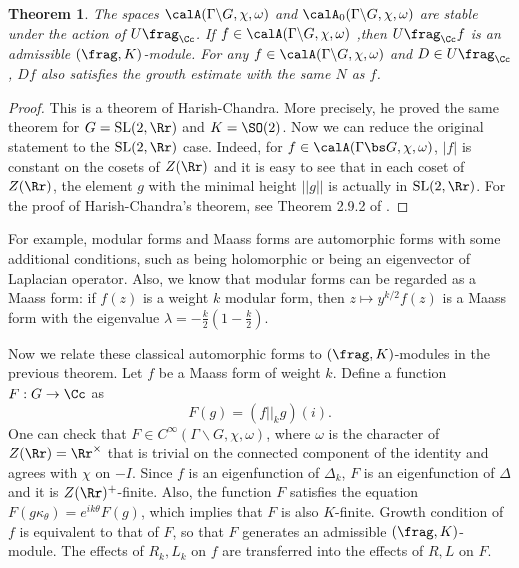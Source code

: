 \documentclass{article}
\newtheorem{theorem}{Theorem}[section]
\newcommand{\SL}{\mathrm{SL}}
\begin{document}
\begin{theorem}
\label{autoadm}
The spaces $\calA(\Gamma\backslash G, \chi, \omega)$ and $\calA_{0}(\Gamma \backslash G, \chi, \omega)$ are stable under the action of $U\frag_{\Cc}$. If $f\in \calA(\Gamma\backslash G, \chi, \omega)$ ,then $U\frag_{\Cc}f$ is an admissible $(\frag, K)$-module. 
For any $f\in  \calA(\Gamma\backslash G, \chi, \omega)$ and $D\in U\frag_{\Cc}$, $Df$ also satisfies the growth estimate with the same $N$ as $f$. 
\end{theorem}

\begin{proof}
This is a theorem of Harish-Chandra. More precisely, he proved the same theorem for $G = \SL(2, \Rr)$ and $K = \SO(2)$. Now we can reduce the original statement to the $\SL(2, \Rr)$ case. 
Indeed, for $f\in \calA(\Gamma \bs G, \chi, \omega)$, $|f|$ is constant on the cosets of $Z(\Rr)$ and it is easy to see that in each coset of $Z(\Rr)$, the element $g$ with the minimal height $||g||$ is actually in $\SL(2, \Rr)$. 
For the proof of Harish-Chandra's theorem, see Theorem 2.9.2 of \cite{bu}.
\end{proof}

For example, modular forms and Maass forms are automorphic forms with some additional conditions, such as being holomorphic  or being an eigenvector of Laplacian operator. 
Also, we know that modular forms can be regarded as a Maass form: if $f(z)$ is a weight $k$ modular form, then $z\mapsto y^{k/2}f(z)$ is a Maass form with the eigenvalue $\lambda = -\frac{k}{2}\left(1-\frac{k}{2}\right)$. 

Now we relate these classical automorphic forms to $(\frag, K)$-modules in the previous theorem. Let $f$ be a Maass form of weight $k$. Define a function $F:G\to \Cc$ as
$$
F(g) = (f||_{k}g)(i). 
$$
One can check that $F\in C^{\infty}(\Gamma\backslash G, \chi, \omega)$, where $\omega$ is the character of $Z(\Rr) = \Rr^{\times}$ that is trivial on the connected component of the identity and agrees with $\chi$ on $-I$. Since $f$ is an eigenfunction of $\Delta_{k}$, $F$ is an eigenfunction of $\Delta$ and it is $Z(\Rr)^{+}$-finite. 
Also, the function $F$ satisfies the equation $F(g\kappa_{\theta}) = e^{ik\theta} F(g)$, which implies that $F$ is also $K$-finite. Growth condition of $f$ is equivalent to that of $F$, so that $F$ generates an admissible $(\frag, K)$-module. The effects of $R_{k}, L_{k}$ on $f$ are transferred into the effects of $R, L$ on $F$. 
\end{document}
